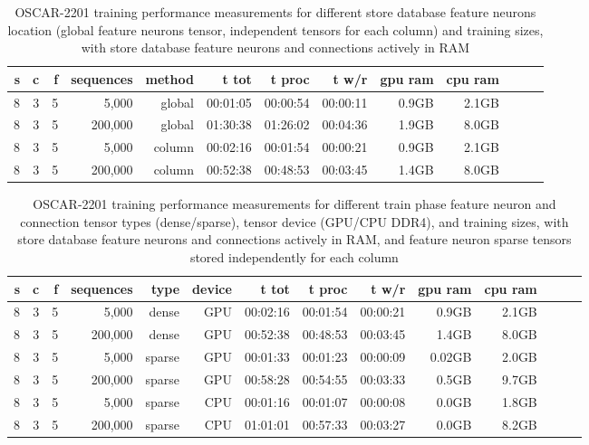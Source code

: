 \begin{table}[H]
\centering
\caption{OSCAR-2201 training performance measurements for different store database feature neurons location (global feature neurons tensor, independent tensors for each column) and training sizes, with store database feature neurons and connections actively in RAM}
\label{tab:oscar-performance-trainGlobalOrColumnFeatureNeuronTensors}
\begin{tabular}{rrrrrrrrrrrrr}
\toprule
\textbf{s} & \textbf{c} & \textbf{f} & \textbf{sequences} & \textbf{method} & \textbf{t tot} & \textbf{t proc} & \textbf{t w/r} & \textbf{gpu ram} & \textbf{cpu ram} \\
\midrule
8 & 3 & 5 & 5,000       & global & 00:01:05 & 00:00:54 & 00:00:11 & 0.9GB & 2.1GB \\
8 & 3 & 5 & 200,000     & global & 01:30:38 & 01:26:02 & 00:04:36 & 1.9GB & 8.0GB \\
8 & 3 & 5 & 5,000       & column & 00:02:16 & 00:01:54 & 00:00:21 & 0.9GB & 2.1GB \\
8 & 3 & 5 & 200,000     & column & 00:52:38 & 00:48:53 & 00:03:45 & 1.4GB & 8.0GB \\
\bottomrule
\end{tabular}
\end{table}

\begin{table}[H]
\centering
\caption{OSCAR-2201 training performance measurements for different train phase feature neuron and connection tensor types (dense/sparse), tensor device (GPU/CPU DDR4), and training sizes, with store database feature neurons and connections actively in RAM, and feature neuron sparse tensors stored independently for each column}
\label{tab:oscar-performance-trainSparseConnectionsNeuronsTensor-storeDatabaseFeatureNeuronsInRamFalse}
\begin{tabular}{rrrrrrrrrrrrrr}
\toprule
\textbf{s} & \textbf{c} & \textbf{f} & \textbf{sequences} & \textbf{type} & \textbf{device} & \textbf{t tot} & \textbf{t proc} & \textbf{t w/r} & \textbf{gpu ram} & \textbf{cpu ram} \\
\midrule
8 & 3 & 5 & 5,000       & dense & GPU & 00:02:16 & 00:01:54 & 00:00:21 & 0.9GB & 2.1GB \\
8 & 3 & 5 & 200,000     & dense & GPU & 00:52:38 & 00:48:53 & 00:03:45 & 1.4GB & 8.0GB \\
8 & 3 & 5 & 5,000       & sparse & GPU & 00:01:33 & 00:01:23 & 00:00:09 & 0.02GB & 2.0GB \\
8 & 3 & 5 & 200,000     & sparse & GPU & 00:58:28 & 00:54:55 & 00:03:33 & 0.5GB & 9.7GB \\
8 & 3 & 5 & 5,000       & sparse & CPU & 00:01:16 & 00:01:07 & 00:00:08 & 0.0GB & 1.8GB \\
8 & 3 & 5 & 200,000     & sparse & CPU & 01:01:01 & 00:57:33 & 00:03:27 & 0.0GB & 8.2GB \\
\bottomrule
\end{tabular}
\end{table}

